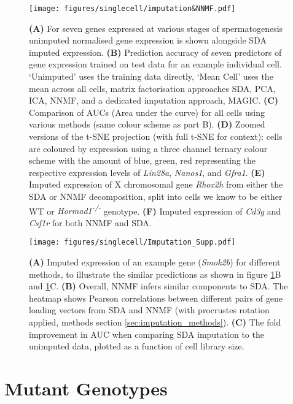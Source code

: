 \begin{figure}[H]
	\centering
	\texttt{[image: figures/singlecell/imputation\&NNMF.pdf]}
	\caption[SDA Imputation]{
		\textbf{(A)} For seven genes expressed at various stages of spermatogenesis unimputed normalised gene expression is shown alongside SDA imputed expression.
		\textbf{(B)} Prediction accuracy of seven predictors of gene expression trained on test data for an example individual cell. ‘Unimputed’ uses the training data directly, ‘Mean Cell’ uses the mean across all cells, matrix factorisation approaches SDA, PCA, ICA, NNMF, and a dedicated imputation approach, MAGIC.
		\textbf{(C)} Comparison of AUCs (Area under the curve) for all cells using various methods (same colour scheme as part B).
		\textbf{(D)} Zoomed versions of the t-SNE projection (with full t-SNE for context): cells are coloured by expression using a three channel ternary colour scheme with the amount of blue, green, red representing the respective expression levels of \textit{Lin28a}, \textit{Nanos1}, and \textit{Gfra1}.
		\textbf{(E)} Imputed expression of X chromosomal gene \textit{Rhox2h} from either the SDA or NNMF decomposition, split into cells we know to be either WT or \textit{Hormad1\textsuperscript{-/-}} genotype.
		\textbf{(F)} Imputed expression of \textit{Cd3g} and \textit{Csf1r} for both NNMF and SDA.}
	\label{fig:imputation}
\end{figure}

\begin{figure}[H]
	\centering
	\texttt{[image: figures/singlecell/Imputation\_Supp.pdf]}
	\caption[Imputation Supplement]{
		\textbf{(A)} Imputed expression of an example gene (\textit{Smok2b}) for different methods, to illustrate the similar predictions as shown in figure \ref{fig:imputation}B and \ref{fig:imputation}C.
		\textbf{(B)} Overall, NNMF infers similar components to SDA. The heatmap shows Pearson correlations between different pairs of gene loading vectors from SDA and NNMF (with procrustes rotation applied, methods section \ref{sec:imputation_methods}).
		\textbf{(C)} The fold improvement in AUC when comparing SDA imputation to the unimputed data, plotted as a function of cell library size.
	}
	\label{fig:imputation_supp}
\end{figure}

\section{Mutant Genotypes}

